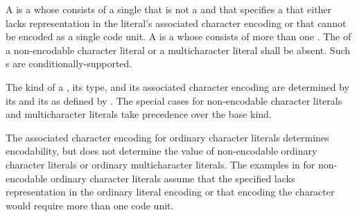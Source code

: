 \documentclass{wg21}
\begin{document}
\pnum
{}%
%
%
%
%
%
%
%
%
%
A 
is a 
whose  consists of a single 
that is not a  and
that specifies a 
that either lacks representation in the literal's associated character encoding
or that cannot be encoded as a single code unit.
A  is a 
whose  consists of
more than one .
The  of
a non-encodable character literal or a multicharacter literal
shall be absent.
Such s are conditionally-supported.

\pnum
The kind of a ,
its type, and its associated character encoding
are determined by
its  and its 
as defined by .
The special cases for
non-encodable character literals and multicharacter literals
take precedence over the base kind.
\begin{note}
    The associated character encoding for ordinary character literals
    determines encodability,
    but does not determine the value of
    non-encodable ordinary character literals or
    ordinary multicharacter literals.
    The examples in 
    for non-encodable ordinary character literals assume that
    the specified  lacks representation in
    the ordinary literal encoding or
    that encoding the character would require more than one code unit.
\end{note}
\end{document}
